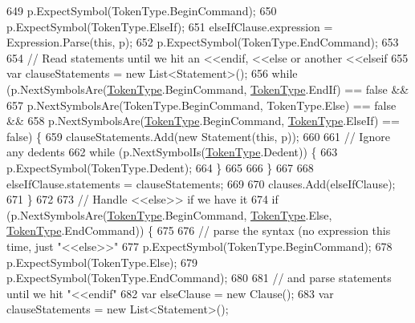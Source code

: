 \begin{DoxyCode}
649                     p.ExpectSymbol(TokenType.BeginCommand);
650                     p.ExpectSymbol(TokenType.ElseIf);
651                     elseIfClause.expression = Expression.Parse(\textcolor{keyword}{this}, p);
652                     p.ExpectSymbol(TokenType.EndCommand);
653 
654                     \textcolor{comment}{// Read statements until we hit an <<endif, <<else or another <<elseif}
655                     var clauseStatements = \textcolor{keyword}{new} List<Statement>();
656                     \textcolor{keywordflow}{while} (p.NextSymbolsAre(\hyperlink{a00029_a301aa7c866593a5b625a8fc158bbeace}{TokenType}.BeginCommand, 
      \hyperlink{a00029_a301aa7c866593a5b625a8fc158bbeace}{TokenType}.EndIf) == \textcolor{keyword}{false} &&
657                         p.NextSymbolsAre(TokenType.BeginCommand, TokenType.Else) == \textcolor{keyword}{false} &&
658                         p.NextSymbolsAre(\hyperlink{a00029_a301aa7c866593a5b625a8fc158bbeace}{TokenType}.BeginCommand, 
      \hyperlink{a00029_a301aa7c866593a5b625a8fc158bbeace}{TokenType}.ElseIf) == \textcolor{keyword}{false}) \{
659                         clauseStatements.Add(\textcolor{keyword}{new} Statement(\textcolor{keyword}{this}, p));
660 
661                         \textcolor{comment}{// Ignore any dedents}
662                         \textcolor{keywordflow}{while} (p.NextSymbolIs(\hyperlink{a00029_a301aa7c866593a5b625a8fc158bbeace}{TokenType}.Dedent)) \{
663                             p.ExpectSymbol(TokenType.Dedent);
664                         \}
665 
666                     \}
667 
668                     elseIfClause.statements = clauseStatements;
669 
670                     clauses.Add(elseIfClause);
671                 \}
672 
673                 \textcolor{comment}{// Handle <<else>> if we have it}
674                 \textcolor{keywordflow}{if} (p.NextSymbolsAre(\hyperlink{a00029_a301aa7c866593a5b625a8fc158bbeace}{TokenType}.BeginCommand, \hyperlink{a00029_a301aa7c866593a5b625a8fc158bbeace}{TokenType}.Else, 
      \hyperlink{a00029_a301aa7c866593a5b625a8fc158bbeace}{TokenType}.EndCommand)) \{
675 
676                     \textcolor{comment}{// parse the syntax (no expression this time, just "<<else>>"}
677                     p.ExpectSymbol(TokenType.BeginCommand);
678                     p.ExpectSymbol(TokenType.Else);
679                     p.ExpectSymbol(TokenType.EndCommand);
680 
681                     \textcolor{comment}{// and parse statements until we hit "<<endif"}
682                     var elseClause = \textcolor{keyword}{new} Clause();
683                     var clauseStatements = \textcolor{keyword}{new} List<Statement>();

\end{DoxyCode}
